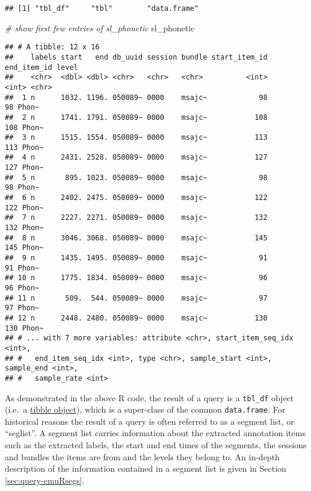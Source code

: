 \documentclass[
]{book}
\newenvironment{Shaded}{\begin{snugshade}}{\end{snugshade}}
\newcommand{\CommentTok}[1]{\textcolor[rgb]{0.56,0.35,0.01}{\textit{#1}}}
\newcommand{\NormalTok}[1]{#1}
\begin{document}
\begin{verbatim}
## [1] "tbl_df"     "tbl"        "data.frame"
\end{verbatim}

\begin{Shaded}
\begin{Highlighting}[]
\CommentTok{\# show first few entries of sl\_phonetic}
\NormalTok{sl\_phonetic}
\end{Highlighting}
\end{Shaded}

\begin{verbatim}
## # A tibble: 12 x 16
##    labels start   end db_uuid session bundle start_item_id end_item_id level
##    <chr>  <dbl> <dbl> <chr>   <chr>   <chr>          <int>       <int> <chr>
##  1 n      1032. 1196. 050089~ 0000    msajc~            98          98 Phon~
##  2 n      1741. 1791. 050089~ 0000    msajc~           108         108 Phon~
##  3 n      1515. 1554. 050089~ 0000    msajc~           113         113 Phon~
##  4 n      2431. 2528. 050089~ 0000    msajc~           127         127 Phon~
##  5 n       895. 1023. 050089~ 0000    msajc~            98          98 Phon~
##  6 n      2402. 2475. 050089~ 0000    msajc~           122         122 Phon~
##  7 n      2227. 2271. 050089~ 0000    msajc~           132         132 Phon~
##  8 n      3046. 3068. 050089~ 0000    msajc~           145         145 Phon~
##  9 n      1435. 1495. 050089~ 0000    msajc~            91          91 Phon~
## 10 n      1775. 1834. 050089~ 0000    msajc~            96          96 Phon~
## 11 n       509.  544. 050089~ 0000    msajc~            97          97 Phon~
## 12 n      2448. 2480. 050089~ 0000    msajc~           130         130 Phon~
## # ... with 7 more variables: attribute <chr>, start_item_seq_idx <int>,
## #   end_item_seq_idx <int>, type <chr>, sample_start <int>, sample_end <int>,
## #   sample_rate <int>
\end{verbatim}

As demonstrated in the above R code, the result of a query is a \texttt{tbl\_df} object (i.e.~a \href{https://tibble.tidyverse.org/index.html}{tibble object}), which is a super-class of the common \texttt{data.frame}. For historical reasons the result of a query is often referred to as a segment list, or ``seglist''. A segment list carries information about the extracted annotation items such as the extracted labels, the start and end times of the segments, the sessions and bundles the items are from and the levels they belong to. An in-depth description of the information contained in a segment list is given in Section \ref{sec:query-emuRsegs}.
\end{document}
